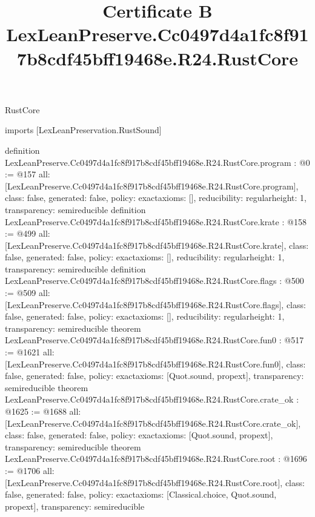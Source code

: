 \begin{lexlean}{RustCore}
\title{Certificate B LexLeanPreserve.Cc0497d4a1fc8f917b8cdf45bff19468e.R24.RustCore}
\begin{coremodule}
imports [LexLeanPreservation.RustSound]

definition LexLeanPreserve.Cc0497d4a1fc8f917b8cdf45bff19468e.R24.RustCore.program : @0 := @157 {
  all: [LexLeanPreserve.Cc0497d4a1fc8f917b8cdf45bff19468e.R24.RustCore.program],
  class: false,
  generated: false,
  policy: exact{axioms: []},
  reducibility: regular{height: 1},
  transparency: semireducible
}
definition LexLeanPreserve.Cc0497d4a1fc8f917b8cdf45bff19468e.R24.RustCore.krate : @158 := @499 {
  all: [LexLeanPreserve.Cc0497d4a1fc8f917b8cdf45bff19468e.R24.RustCore.krate],
  class: false,
  generated: false,
  policy: exact{axioms: []},
  reducibility: regular{height: 1},
  transparency: semireducible
}
definition LexLeanPreserve.Cc0497d4a1fc8f917b8cdf45bff19468e.R24.RustCore.flags : @500 := @509 {
  all: [LexLeanPreserve.Cc0497d4a1fc8f917b8cdf45bff19468e.R24.RustCore.flags],
  class: false,
  generated: false,
  policy: exact{axioms: []},
  reducibility: regular{height: 1},
  transparency: semireducible
}
theorem LexLeanPreserve.Cc0497d4a1fc8f917b8cdf45bff19468e.R24.RustCore.fun0 : @517 := @1621 {
  all: [LexLeanPreserve.Cc0497d4a1fc8f917b8cdf45bff19468e.R24.RustCore.fun0],
  class: false,
  generated: false,
  policy: exact{axioms: [Quot.sound, propext]},
  transparency: semireducible
}
theorem LexLeanPreserve.Cc0497d4a1fc8f917b8cdf45bff19468e.R24.RustCore.crate_ok : @1625 := @1688 {
  all: [LexLeanPreserve.Cc0497d4a1fc8f917b8cdf45bff19468e.R24.RustCore.crate_ok],
  class: false,
  generated: false,
  policy: exact{axioms: [Quot.sound, propext]},
  transparency: semireducible
}
theorem LexLeanPreserve.Cc0497d4a1fc8f917b8cdf45bff19468e.R24.RustCore.root : @1696 := @1706 {
  all: [LexLeanPreserve.Cc0497d4a1fc8f917b8cdf45bff19468e.R24.RustCore.root],
  class: false,
  generated: false,
  policy: exact{axioms: [Classical.choice, Quot.sound, propext]},
  transparency: semireducible
}


\end{coremodule}
\end{lexlean}
